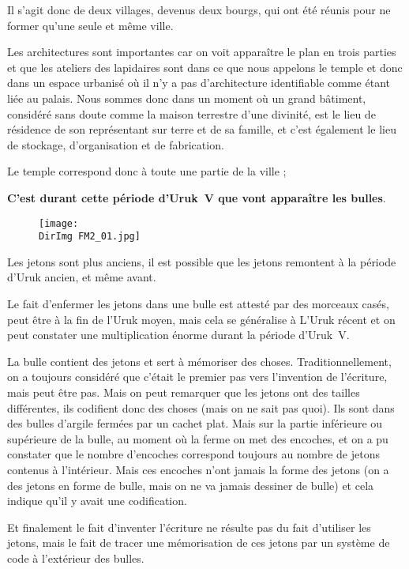 \documentclass[a4paper,10pt]{article}
\newcommand{\DirImg}{../img/FaivreMartin/}
\begin{document}
Il s'agit donc de deux villages, devenus deux bourgs, qui ont été réunis 
pour ne former qu'une seule et même ville.

Les architectures sont importantes car on voit apparaître le plan en 
trois parties et que les ateliers des lapidaires sont dans ce que nous 
appelons le temple et donc dans un espace urbanisé où il n'y a pas 
d'architecture identifiable comme étant liée au palais. Nous sommes donc 
dans un moment où un grand bâtiment, considéré sans doute comme la maison 
terrestre d'une divinité, est le lieu de résidence de son représentant 
sur terre et de sa famille, et c'est également le lieu de stockage, 
d'organisation et de fabrication.

Le temple correspond donc à toute une partie de la ville ;

\textbf{C'est durant cette période d'Uruk~V que vont apparaître les bulles}.

\begin{figure}
  \centering
  \texttt{[image: \\DirImg FM2\_01.jpg]}
  \caption{}
  \label{}
\end{figure}

Les jetons sont plus anciens, il est possible que les jetons remontent 
à la période d'Uruk ancien, et même avant.

Le fait d'enfermer les jetons dans une bulle est attesté par des 
morceaux casés, peut être à la fin de l'Uruk moyen, mais cela se 
généralise à L'Uruk récent et on peut constater une multiplication 
énorme durant la période d'Uruk~V.

La bulle contient des jetons et sert à mémoriser des choses. 
Traditionnellement, on a toujours considéré que c'était le premier 
pas vers l'invention de l'écriture, mais peut être pas. Mais on peut 
remarquer que les jetons ont des tailles différentes, ils codifient 
donc des choses (mais on ne sait pas quoi). Ils sont dans des bulles 
d'argile fermées par un cachet plat. Mais sur la partie inférieure 
ou supérieure de la bulle, au moment où la ferme on met des encoches, 
et on a pu constater que le nombre d'encoches correspond toujours au 
nombre de jetons contenus à l'intérieur. Mais ces encoches n'ont jamais 
la forme des jetons (on a des jetons en forme de bulle, mais on ne va 
jamais dessiner de bulle) et cela indique qu'il y avait une codification.

Et finalement le fait d'inventer l'écriture ne résulte pas du fait 
d'utiliser les jetons, mais le fait de tracer une mémorisation de ces 
jetons par un système de code à l'extérieur des bulles.
\end{document}
